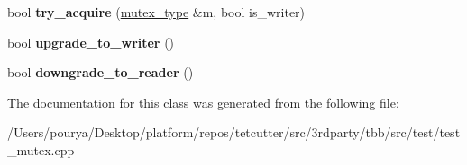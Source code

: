 \begin{DoxyCompactItemize}
\item 
\hypertarget{classTBB__MutexFromISO__Mutex_1_1scoped__lock_a17b242151250822ee8faafdadfc21136}{}bool {\bfseries try\+\_\+acquire} (\hyperlink{classTBB__MutexFromISO__Mutex}{mutex\+\_\+type} \&m, bool is\+\_\+writer)\label{classTBB__MutexFromISO__Mutex_1_1scoped__lock_a17b242151250822ee8faafdadfc21136}

\item 
\hypertarget{classTBB__MutexFromISO__Mutex_1_1scoped__lock_aaa3e5ac71e7bdbad61e6f2a91cd0e499}{}bool {\bfseries upgrade\+\_\+to\+\_\+writer} ()\label{classTBB__MutexFromISO__Mutex_1_1scoped__lock_aaa3e5ac71e7bdbad61e6f2a91cd0e499}

\item 
\hypertarget{classTBB__MutexFromISO__Mutex_1_1scoped__lock_a379538738f7bd3829b7edb710666bf9a}{}bool {\bfseries downgrade\+\_\+to\+\_\+reader} ()\label{classTBB__MutexFromISO__Mutex_1_1scoped__lock_a379538738f7bd3829b7edb710666bf9a}

\end{DoxyCompactItemize}


The documentation for this class was generated from the following file\+:\begin{DoxyCompactItemize}
\item 
/\+Users/pourya/\+Desktop/platform/repos/tetcutter/src/3rdparty/tbb/src/test/test\+\_\+mutex.\+cpp\end{DoxyCompactItemize}
